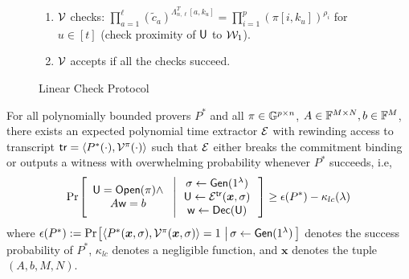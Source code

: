 \begin{figure}[h!]
{\begin{framed}
\begin{enumerate}[{\rm 1.}]
\begin{enumerate}
					for $u\in [t]$ where $\mathsf{cm}_{k_u}=\prod_{a=1}^{s+\ell-1}c_a^{\Lambda^T_{n,s+\ell-1}[a,k_u]}$, 
					$v_u=\sum_{i=1}^pR^i(\alpha_{j_u},\eta_{k_u})U[i,j_u,k_u]$ (check consistency of $P$ with $\pi$).
					\item $\innerproduct(\mathsf{pp},1^m||0^{m-1},\mathsf{cm},r^Tb;z)$ where $z=\beta P_0+\overline{P}\varphi$ and $\mathsf{cm}=c_0^{\beta}\cdot \prod_{a=1}^{s+\ell-1}c_k^{\varphi_k}$ (check the condition $r^TAw=r^Tb$).
					\item $\innerproduct(\mathsf{pp},\bm{1}_{j_u}^T\Lambda_{h,m},C_u,\innp{\delta}{X_u}; V_u)$ for $u\in [t]$ 
					where $C_u=\prod_{i=1}^p(\pi[i,k_u])^{\delta_i}$ and $V_u=\sum_{i\in[p]} \delta_i\ewit[i,\cdot,k_u]$ (consistency of $X_u$ with $\pi$). 
				\end{enumerate}
				\item $\mathcal{V}$ checks: $\prod_{a=1}^\ell(\tilde{c}_a)^{\Lambda^T_{n,\ell}[a,k_u]}=\prod_{i=1}^p(\pi[i,k_u])^{\rho_i}$ for $u\in [t]$ (check proximity of $\mathsf{U}$ to $\mathcal{W}_1$).
				\item $\mathcal{V}$ accepts if all the checks succeed.
			\end{enumerate}
		\end{framed}
		\vspace{-0.4cm}
		\caption{Linear Check Protocol}
		\label{fig:linearcheck}
	}
\end{figure}

\begin{lemma}[Soundness]\label{lem:linearcheck_sound}
For all polynomially bounded provers $P^\ast$ and all $\pi\in \mathbb{G}^{p\times n}$,
$A\in \mathbb{F}^{M\times N}, b\in \mathbb{F}^M$, there exists an expected polynomial time
extractor $\mathcal{E}$ with rewinding access to transcript $\mathsf{tr}=\langle
P^\ast(\cdot),\mathcal{V}^\pi(\cdot)\rangle$ such that $\mathcal{E}$ either breaks the 
commitment binding or outputs a witness with overwhelming probability whenever 
$P^\ast$ succeeds, i.e,
{\small
\begin{align*}
\condprob{\begin{array}{c}
\ewit=\open(\pi)\wedge \\
A\wit=b
\end{array}
}{
\begin{array}{c}
\sigma\gets \gen(\secparam) \\
\ewit\gets \extr^{\mathsf{tr}}(\bm{x},\sigma) \\
\wit\gets \dec(\ewit)
\end{array}}\geq
\epsilon(P^\ast)-\kappa_{lc}(\secpar)
\end{align*}
}
where $\epsilon(P^\ast):= \condprob{\langle P^\ast(\bm{x},\sigma),\verifier^\pi(\bm{x},\sigma)\rangle=1}{\sigma\gets \gen(\secparam)}$ denotes the success probability of $P^\ast$, $\kappa_{lc}$ denotes a negligible function, and $\bm{x}$ denotes the tuple $(A,b,M,N)$.
\end{lemma}

